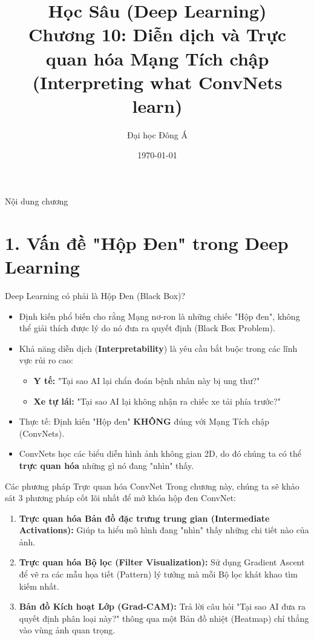\documentclass[aspectratio=169]{beamer}
\title[Chương 10: Trực quan hóa ConvNets]{Học Sâu (Deep Learning) \\ \vspace{0.5cm} \Large Chương 10: Diễn dịch và Trực quan hóa Mạng Tích chập \\ (Interpreting what ConvNets learn)}
\author{Đại học Đông Á}
\date{\today}
\begin{document}
\begin{frame}
    \titlepage
\end{frame}

\begin{frame}{Nội dung chương}
    \tableofcontents
\end{frame}

\section{1. Vấn đề "Hộp Đen" trong Deep Learning}

\begin{frame}{Deep Learning có phải là Hộp Đen (Black Box)?}
    \begin{itemize}
        \item Định kiến phổ biến cho rằng Mạng nơ-ron là những chiếc "Hộp đen", không thể giải thích được lý do nó đưa ra quyết định (Black Box Problem).
        \item Khả năng diễn dịch (\textbf{Interpretability}) là yêu cầu bắt buộc trong các lĩnh vực rủi ro cao:
        \begin{itemize}
            \item \textbf{Y tế:} "Tại sao AI lại chẩn đoán bệnh nhân này bị ung thư?"
            \item \textbf{Xe tự lái:} "Tại sao AI lại không nhận ra chiếc xe tải phía trước?"
        \end{itemize}
        \item Thực tế: Định kiến "Hộp đen" \textbf{KHÔNG} đúng với Mạng Tích chập (ConvNets).
        \item ConvNets học các biểu diễn hình ảnh không gian 2D, do đó chúng ta có thể \textbf{trực quan hóa} những gì nó đang "nhìn" thấy.
    \end{itemize}
\end{frame}

\begin{frame}{Các phương pháp Trực quan hóa ConvNet}
    Trong chương này, chúng ta sẽ khảo sát 3 phương pháp cốt lõi nhất để mở khóa hộp đen ConvNet:
    \begin{enumerate}
        \item \textbf{Trực quan hóa Bản đồ đặc trưng trung gian (Intermediate Activations):} Giúp ta hiểu mô hình đang "nhìn" thấy những chi tiết nào của ảnh.
        \item \textbf{Trực quan hóa Bộ lọc (Filter Visualization):} Sử dụng Gradient Ascent để vẽ ra các mẫu họa tiết (Pattern) lý tưởng mà mỗi Bộ lọc khát khao tìm kiếm nhất.
        \item \textbf{Bản đồ Kích hoạt Lớp (Grad-CAM):} Trả lời câu hỏi "Tại sao AI đưa ra quyết định phân loại này?" thông qua một Bản đồ nhiệt (Heatmap) chỉ thẳng vào vùng ảnh quan trọng.
    \end{enumerate}
\end{frame}
\end{document}
